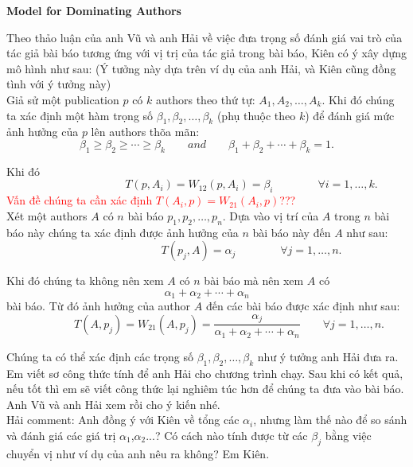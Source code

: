 \documentclass[lnicst]{svmultln}
\begin{document}
%
\begin{center}
\Large{\bf Model for Dominating Authors}
\end{center}


Theo thảo luận của anh Vũ và anh Hải về việc đưa trọng số đánh giá vai trò của tác giả bài báo tương ứng với vị trị của tác giả trong bài báo, Kiên có ý xây dựng mô hình như sau: (Ý tưởng này dựa trên ví dụ của anh Hải, và Kiên cũng đồng tình với ý tưởng này)
\\[-2mm]

Giả sử một publication $p$ có $k$ authors theo thứ tự: $A_1, A_2,\ldots, A_k$. Khi đó chúng ta xác định một hàm trọng số $\beta_1,\beta_2,\ldots,\beta_k$ (phụ thuộc theo $k$) để đánh giá mức ảnh hưởng của $p$ lên authors thõa mãn:
\[\beta_1 \geqslant \beta_2 \geqslant \cdots \geqslant \beta_k \qquad and \qquad \beta_1 + \beta_2 + \cdots + \beta_k = 1.\]

Khi đó
\[\qquad\qquad\qquad\qquad T(p,A_i) = W_{12}(p,A_i) = \beta_i \qquad\qquad \forall i = 1,\ldots,k.\]
\textcolor{red}{
Vấn đề chúng ta cần xác định $T(A_i,p) = W_{21}(A_i,p)$???}
\\[-2mm]

Xét một authors $A$ có $n$ bài báo $p_1,p_2,\ldots,p_n$. Dựa vào vị trí của $A$ trong $n$ bài báo này chúng ta xác định được ảnh hưởng của $n$ bài báo này đến $A$ như sau:
\[\qquad\qquad\qquad\qquad T(p_j,A) = \alpha_j \qquad\qquad \forall j = 1,\ldots,n.\]

Khi đó chúng ta không nên xem $A$ có $n$ bài báo mà nên xem $A$ có
\[\alpha_1 + \alpha_2 + \cdots + \alpha_n\]
bài báo. Từ đó ảnh hưởng của author $A$ đến các bài báo được xác định như sau:
\[\qquad\qquad T(A,p_j) = W_{21}(A,p_j) = \frac{\alpha_j}{\alpha_1 + \alpha_2 + \cdots + \alpha_n} \qquad\forall j = 1,\ldots,n.\]

Chúng ta có thể xác định các trọng số $\beta_1,\beta_2,\ldots,\beta_k$ như ý tưởng anh Hải đưa ra.
\\[-2mm]

Em viết sơ công thức tính để anh Hải cho chương trình chạy. Sau khi có kết quả, nếu tốt thì em sẽ viết công thức lại nghiêm túc hơn để chúng ta đưa vào bài báo. Anh Vũ và anh Hải xem rồi cho ý kiến nhé.
\\[-2mm]

Hải comment:
Anh đồng ý với Kiên về tổng các $\alpha_i$, nhưng làm thế nào để so sánh và đánh giá các giá trị $\alpha_1$,$\alpha_2$...?
Có cách nào tính được từ các $\beta_j$ bằng việc chuyển vị như ví dụ của anh nêu ra không?
Em Kiên.
\\[-2mm]
\end{document}
